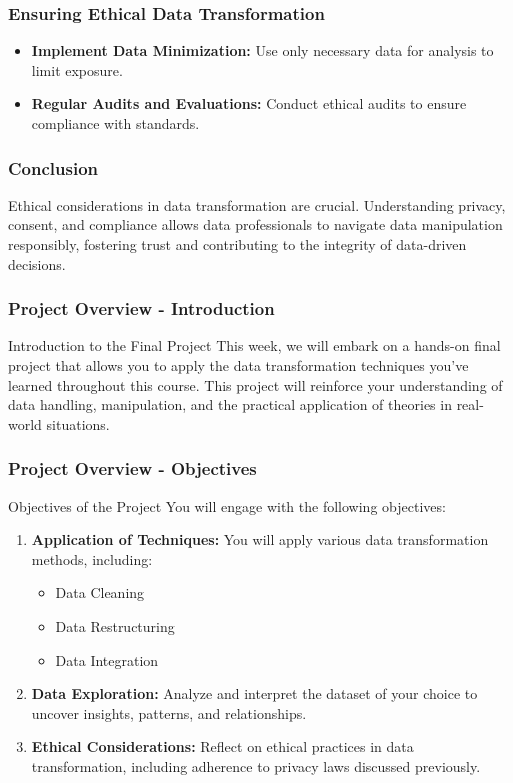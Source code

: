 \documentclass[aspectratio=169]{beamer}
\begin{document}
\begin{frame}[fragile]
    \frametitle{Ensuring Ethical Data Transformation}
    \begin{itemize}
        \item \textbf{Implement Data Minimization:} Use only necessary data for analysis to limit exposure.
        \item \textbf{Regular Audits and Evaluations:} Conduct ethical audits to ensure compliance with standards.
    \end{itemize}
\end{frame}

\begin{frame}[fragile]
    \frametitle{Conclusion}
    Ethical considerations in data transformation are crucial. Understanding privacy, consent, and compliance allows data professionals to navigate data manipulation responsibly, fostering trust and contributing to the integrity of data-driven decisions.
\end{frame}

\begin{frame}[fragile]
    \frametitle{Project Overview - Introduction}
    \begin{block}{Introduction to the Final Project}
        This week, we will embark on a hands-on final project that allows you to apply the data transformation techniques you've learned throughout this course. 
        This project will reinforce your understanding of data handling, manipulation, and the practical application of theories in real-world situations.
    \end{block}
\end{frame}

\begin{frame}[fragile]
    \frametitle{Project Overview - Objectives}
    \begin{block}{Objectives of the Project}
        You will engage with the following objectives:
        \begin{enumerate}
            \item \textbf{Application of Techniques:} You will apply various data transformation methods, including:
            \begin{itemize}
                \item Data Cleaning
                \item Data Restructuring 
                \item Data Integration
            \end{itemize}
            \item \textbf{Data Exploration:} Analyze and interpret the dataset of your choice to uncover insights, patterns, and relationships.
            \item \textbf{Ethical Considerations:} Reflect on ethical practices in data transformation, including adherence to privacy laws discussed previously.
        \end{enumerate}
    \end{block}
\end{frame}
\end{document}
